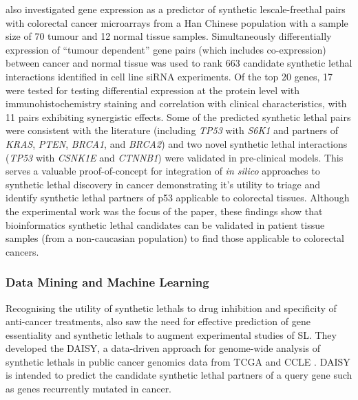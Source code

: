 \citet{Tiong2014} also investigated gene expression as a predictor of synthetic lescale-freethal pairs with colorectal cancer microarrays from a Han Chinese population with a sample size of 70 tumour and 12 normal tissue samples. Simultaneously differentially expression of ``tumour dependent'' gene pairs (which includes co-expression) between cancer and normal tissue was used to rank 663 candidate \gls{synthetic lethal} interactions identified in cell line siRNA experiments. Of the top 20 genes, 17 were tested for testing differential expression at the protein level with immunohistochemistry staining and correlation with clinical characteristics, with 11 pairs exhibiting synergistic effects. Some of the predicted \gls{synthetic lethal} pairs were consistent with the literature (including \textit{TP53} with \textit{S6K1} and partners of \textit{KRAS},  \textit{PTEN}, \textit{BRCA1}, and \textit{BRCA2}) and two novel \gls{synthetic lethal} interactions (\textit{TP53} with \textit{CSNK1E} and \textit{CTNNB1}) were validated in pre-clinical models. This serves a valuable proof-of-concept for integration of \textit{in silico} approaches to \gls{synthetic lethal} discovery in cancer demonstrating it's utility to triage and identify \gls{synthetic lethal} partners of p53 applicable to colorectal tissues. Although the experimental work was the focus of the paper, these findings show that \gls{bioinformatics} \gls{synthetic lethal} candidates can be validated in patient tissue samples (from a non-caucasian population) to find those applicable to colorectal cancers.

\subsubsection{Data Mining and Machine Learning}


Recognising the utility of \glspl{synthetic lethal} to drug inhibition and specificity of anti-cancer treatments, \citet{Jerby2014} also saw the need for effective prediction of gene essentiality and \glspl{synthetic lethal} to augment experimental studies of SL. They developed the \gls{DAISY}, a data-driven approach for genome-wide analysis of \glspl{synthetic lethal} in public cancer \gls{genomics} data from \gls{TCGA} and \gls{CCLE}  \citep{Barretina2012}. \gls{DAISY} is intended to predict the candidate \gls{synthetic lethal} partners of a query gene such as genes recurrently mutated in cancer.  

